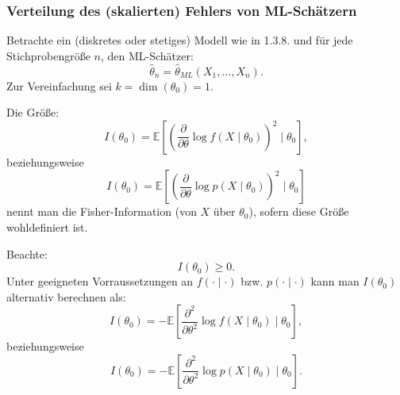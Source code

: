 \documentclass[10pt]{article}
\newcommand{\FZV}{X_1, \ldots, X_n} %
\newcommand{\EW}{\mathbb{E}} %
\newcommand{\eqname}[1]{\tag*{#1}}%
\begin{document}
	\subsubsection{Verteilung des (skalierten) Fehlers von ML-Schätzern}

	\begin{Definition}
		Betrachte ein (diskretes oder stetiges) Modell wie in 1.3.8. und für jede Stichprobengröße $n$, den ML-Schätzer: 
	\begin{equation*}
		\hat{\theta}_n = \hat{\theta}_{ML}(\FZV).
	\end{equation*}
	Zur Vereinfachung sei $k = \dim(\theta_0) = 1$.
	
	Die Größe:
	\begin{equation*}
		I(\theta_0) = \EW\left[\left(\frac{\partial}{\partial \theta} \log f( X\mid \theta_0)\right)^2 \mid \theta_0 \right], \eqname{(stetig)}
	\end{equation*}
	beziehungsweise
	\begin{equation*}
		I(\theta_0) = \EW\left[\left(\frac{\partial}{\partial \theta} \log p( X\mid \theta_0)\right)^2 \mid \theta_0 \right] \eqname{(diskret)}
	\end{equation*}
	nennt man die Fisher-Information (von $X$ über $\theta_0$), sofern diese Größe wohldefiniert ist. 
	
	Beachte:
	\begin{equation*}
		I(\theta_0) \geq 0.
	\end{equation*}
	Unter geeigneten Vorraussetzungen an $f(\cdot \mid \cdot)$ bzw. $p(\cdot \mid \cdot)$ kann man $I(\theta_0)$ alternativ berechnen als:
	\begin{equation*}
		I(\theta_0) = -\EW \left[\frac{\partial^2}{\partial \theta^2} \log f(X\mid\theta_0) \mid \theta_0 \right], \eqname{(stetig)}
	\end{equation*}
	beziehungsweise
	\begin{equation*}
		I(\theta_0) = -\EW \left[\frac{\partial^2}{\partial \theta^2} \log p(X\mid\theta_0) \mid \theta_0 \right]. \eqname{(diskret)}
	\end{equation*}
	\end{Definition}
	
\end{document}
